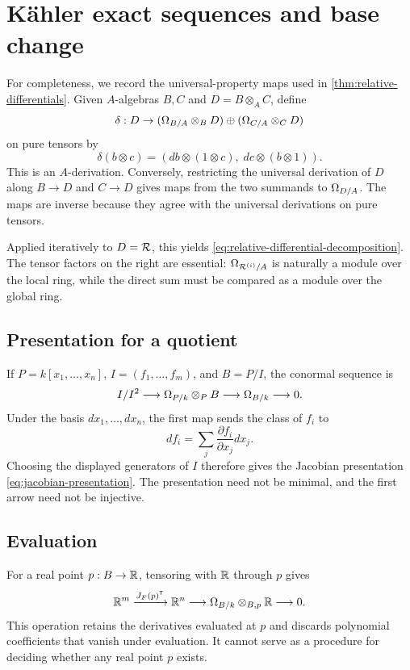 \section{K\"ahler exact sequences and base change}
\label{app:kahler}

For completeness, we record the universal-property maps used in
\cref{thm:relative-differentials}.  Given \(A\)-algebras \(B,C\) and
\(D=B\otimes_A C\), define
\begin{equation}
 \delta:D\to
 (\Omega_{B/A}\otimes_BD)\oplus(\Omega_{C/A}\otimes_CD)
\end{equation}
on pure tensors by
\begin{equation}
 \delta(b\otimes c)=
 (db\otimes(1\otimes c),\;dc\otimes(b\otimes1)).
\end{equation}
This is an \(A\)-derivation.  Conversely, restricting the universal derivation
of \(D\) along \(B\to D\) and \(C\to D\) gives maps from the two summands to
\(\Omega_{D/A}\).  The maps are inverse because they agree with the universal
derivations on pure tensors.

Applied iteratively to \(D=\mathcal{R}\), this yields
\cref{eq:relative-differential-decomposition}.  The tensor factors on the
right are essential: \(\Omega_{\mathcal{R}^{(i)}/A}\) is naturally a module over the local
ring, while the direct sum must be compared as a module over the global ring.

\subsection{Presentation for a quotient}

If \(P=k[x_1,\ldots,x_n]\), \(I=(f_1,\ldots,f_m)\), and \(B=P/I\), the conormal
sequence is
\begin{equation}
 I/I^2\longrightarrow
 \Omega_{P/k}\otimes_PB
 \longrightarrow\Omega_{B/k}\longrightarrow0.
\end{equation}
Under the basis \(dx_1,\ldots,dx_n\), the first map sends the class of \(f_i\)
to
\begin{equation}
 df_i=\sum_j\frac{\partial f_i}{\partial x_j}dx_j.
\end{equation}
Choosing the displayed generators of \(I\) therefore gives the Jacobian
presentation \cref{eq:jacobian-presentation}.  The presentation need not be
minimal, and the first arrow need not be injective.

\subsection{Evaluation}

For a real point \(p:B\to\mathbb{R}\), tensoring with \(\mathbb{R}\) through \(p\) gives
\begin{equation}
 \mathbb{R}^m\xrightarrow{J_F(p)^{\mathsf T}}\mathbb{R}^n
 \longrightarrow \Omega_{B/k}\otimes_{B,p}\mathbb{R}\longrightarrow0.
\end{equation}
This operation retains the derivatives evaluated at \(p\) and discards
polynomial coefficients that vanish under evaluation.  It cannot serve as a
procedure for deciding whether any real point \(p\) exists.
